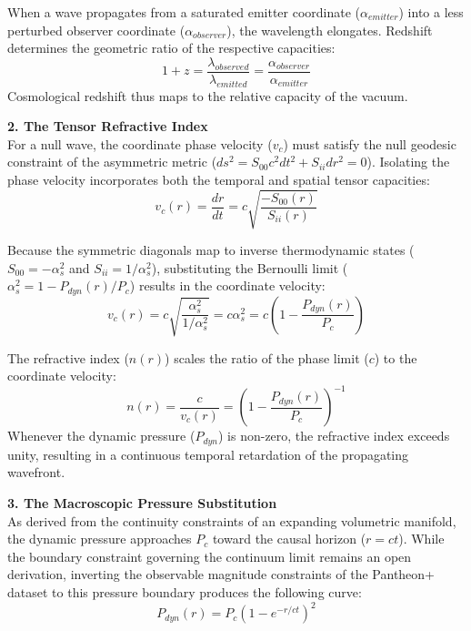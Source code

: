 When a wave propagates from a saturated emitter coordinate ($\alpha_{emitter}$) into a less perturbed observer coordinate ($\alpha_{observer}$), the wavelength elongates. Redshift determines the geometric ratio of the respective capacities:
\begin{equation}
    1 + z = \frac{\lambda_{observed}}{\lambda_{emitted}} = \frac{\alpha_{observer}}{\alpha_{emitter}} \label{eq:redshift_capacity_ratio}
\end{equation}
Cosmological redshift thus maps to the relative capacity of the vacuum.

\vspace{0.2 cm}

\textbf{2. The Tensor Refractive Index} \\ 
For a null wave, the coordinate phase velocity ($v_c$) must satisfy the null geodesic constraint of the asymmetric metric ($ds^2 = S_{00} c^2 dt^2 + S_{ii} dr^2 = 0$). Isolating the phase velocity incorporates both the temporal and spatial tensor capacities: 
\begin{equation}
    v_c(r) = \frac{dr}{dt} = c \sqrt{\frac{-S_{00}(r)}{S_{ii}(r)}}
\end{equation}

Because the symmetric diagonals map to inverse thermodynamic states ($S_{00} = -\alpha_s^2$ and $S_{ii} = 1/\alpha_s^2$), substituting the Bernoulli limit ($\alpha_s^2 = 1 - P_{dyn}(r)/P_c$) results in the coordinate velocity: 
\begin{equation}
    v_c(r) = c \sqrt{\frac{\alpha_s^2}{1/\alpha_s^2}} = c \alpha_s^2 = c \left( 1 - \frac{P_{dyn}(r)}{P_c} \right)
\end{equation}

The refractive index ($n(r)$) scales the ratio of the phase limit ($c$) to the coordinate velocity: 
\begin{equation}
    n(r) = \frac{c}{v_c(r)} = \left( 1 - \frac{P_{dyn}(r)}{P_c} \right)^{-1}
\end{equation}
Whenever the dynamic pressure ($P_{dyn}$) is non-zero, the refractive index exceeds unity, resulting in a continuous temporal retardation of the propagating wavefront.

\vspace{0.2 cm}

\textbf{3. The Macroscopic Pressure Substitution} \\ 
As derived from the continuity constraints of an expanding volumetric manifold, the dynamic pressure approaches $P_c$ toward the causal horizon ($r = ct$). While the boundary constraint governing the continuum limit remains an open derivation, inverting the observable magnitude constraints of the Pantheon+ dataset \cite{Brout2022} to this pressure boundary produces the following curve: 
\begin{equation}
    P_{dyn}(r) = P_c \left( 1 - e^{-r/ct} \right)^2 \label{eq:dark_energy}
\end{equation}

